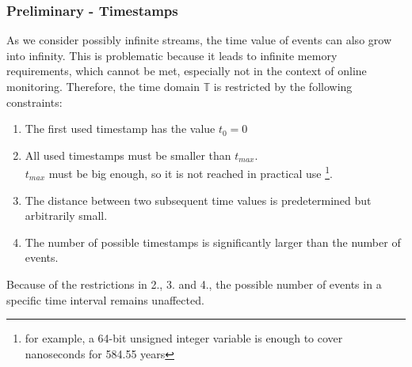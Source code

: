 	\subsubsection{Preliminary - Timestamps}
		\label{monitorability_timestamps}
		As we consider possibly infinite streams, the time value of events can also grow into infinity. This is problematic because it leads to infinite memory requirements, which cannot be met, especially not in the context of online monitoring. Therefore, the time domain $\mathbb{T}$ is restricted by the following constraints:
		\begin{enumerate}[1.]
			\item
				The first used timestamp has the value $t_0=0$
			\item
				All used timestamps must be smaller than $t_{max}$.\\
				$t_{max}$ must be big enough, so it is not reached in practical use \footnote{for example, a 64-bit unsigned integer variable is enough to cover nanoseconds for 584.55 years}.
			\item
				The distance between two subsequent time values is predetermined but arbitrarily small.
			\item
				The number of possible timestamps is significantly larger than the number of events.
		\end{enumerate}
	Because of the restrictions in 2., 3. and 4., the possible number of events in a specific time interval remains unaffected.

